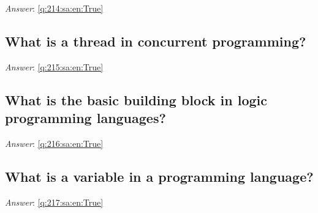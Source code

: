 \documentclass[a4paper,11pt,oneside]{article}
\begin{document}
\begin{sloppypar}
\label{q:214:sa:en:False}

\vspace{2cm}

\noindent\makebox[\textwidth]{\hrulefill}

\vspace{1cm}

\textit{Answer}: \autoref{q:214:sa:en:True}



\subsection{What is a thread in concurrent programming?}

\label{q:215:sa:en:False}

\vspace{2cm}

\noindent\makebox[\textwidth]{\hrulefill}

\vspace{1cm}

\textit{Answer}: \autoref{q:215:sa:en:True}



\subsection{What is the basic building block in logic programming languages?}

\label{q:216:sa:en:False}

\vspace{2cm}

\noindent\makebox[\textwidth]{\hrulefill}

\vspace{1cm}

\textit{Answer}: \autoref{q:216:sa:en:True}



\subsection{What is a variable in a programming language?}

\label{q:217:sa:en:False}

\vspace{2cm}

\noindent\makebox[\textwidth]{\hrulefill}

\vspace{1cm}

\textit{Answer}: \autoref{q:217:sa:en:True}




\end{sloppypar}
\end{document}
